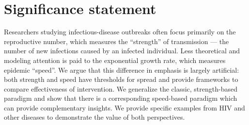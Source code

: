 \section*{Significance statement}

Researchers studying infectious-disease outbreaks often focus primarily on the reproductive number, which measures the ``strength'' of transmission --- the number of new infections caused by an infected individual.
Less theoretical and modeling attention is paid to the exponential growth rate, which measures epidemic ``speed''. 
We argue that this difference in emphasis is largely artificial: both strength and speed have thresholds for spread and provide frameworks to compare effectiveness of intervention.
We generalize the classic, strength-based paradigm and show that there is a corresponding speed-based paradigm which can provide complementary insights.
We provide specific examples from HIV and other diseases to demonstrate the value of both perspectives.
